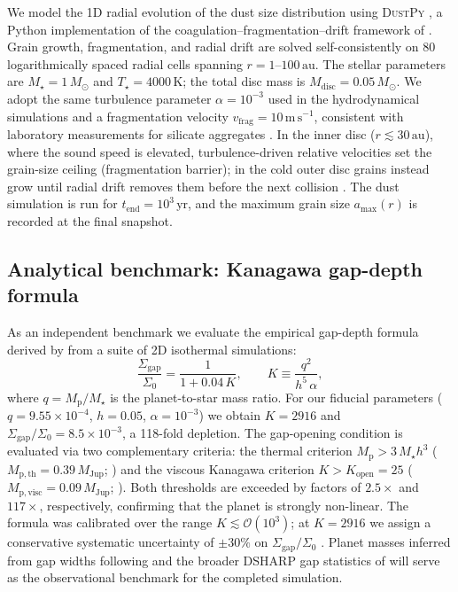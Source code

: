 We model the 1D radial evolution of the dust size distribution using
\textsc{DustPy} \citep{Stammler2022}, a Python implementation of the
coagulation--fragmentation--drift framework of
\citet{Birnstiel2010}.
Grain growth, fragmentation, and radial drift are solved self-consistently
on 80 logarithmically spaced radial cells spanning $r = 1$--$100\,\mathrm{au}$.
The stellar parameters are $M_\star = 1\,M_\odot$ and
$T_\star = 4000\,\mathrm{K}$; the total disc mass is
$M_\mathrm{disc} = 0.05\,M_\odot$.
We adopt the same turbulence parameter $\alpha = 10^{-3}$ used in the
hydrodynamical simulations and a fragmentation velocity
$v_\mathrm{frag} = 10\,\mathrm{m\,s}^{-1}$, consistent with
laboratory measurements for silicate aggregates \citep{Birnstiel2012}.
In the inner disc ($r \lesssim 30\,\mathrm{au}$), where the sound speed is
elevated, turbulence-driven relative velocities set the grain-size ceiling
(fragmentation barrier); in the cold outer disc grains instead grow until
radial drift removes them before the next collision \citep{Birnstiel2012}.
The dust simulation is run for $t_\mathrm{end} = 10^3\,\mathrm{yr}$, and
the maximum grain size $a_\mathrm{max}(r)$ is recorded at the final snapshot.

\subsection{Analytical benchmark: Kanagawa gap-depth formula}
\label{sec:analytical}

As an independent benchmark we evaluate the empirical gap-depth formula
derived by \citet{Kanagawa2016} from a suite of 2D isothermal simulations:
%
\begin{equation}
  \frac{\Sigma_\mathrm{gap}}{\Sigma_0} = \frac{1}{1 + 0.04\,K},
  \qquad
  K \equiv \frac{q^2}{h^5\,\alpha},
  \label{eq:kanagawa_depth}
\end{equation}
%
where $q = M_\mathrm{p}/M_\star$ is the planet-to-star mass ratio.
For our fiducial parameters ($q = 9.55\times10^{-4}$, $h = 0.05$,
$\alpha = 10^{-3}$) we obtain $K = 2916$ and
$\Sigma_\mathrm{gap}/\Sigma_0 = 8.5\times10^{-3}$, a 118-fold depletion.
The gap-opening condition is evaluated via two complementary criteria: the
thermal criterion $M_\mathrm{p} > 3\,M_\star h^3$
($M_\mathrm{p,th} = 0.39\,M_\mathrm{Jup}$; \citealt{Crida2006}) and the
viscous Kanagawa criterion $K > K_\mathrm{open} = 25$
($M_\mathrm{p,visc} = 0.09\,M_\mathrm{Jup}$; \citealt{Kanagawa2016}).
Both thresholds are exceeded by factors of $2.5\times$ and $117\times$,
respectively, confirming that the planet is strongly non-linear.
The \citet{Kanagawa2016} formula was calibrated over the range
$K \lesssim \mathcal{O}(10^3)$; at $K = 2916$ we assign a conservative
systematic uncertainty of $\pm30\%$ on $\Sigma_\mathrm{gap}/\Sigma_0$
\citep{Kanagawa2017}.
Planet masses inferred from gap widths following \citet{Zhang2018} and the
broader DSHARP gap statistics of \citet{Huang2018} will serve as the
observational benchmark for the completed simulation.

